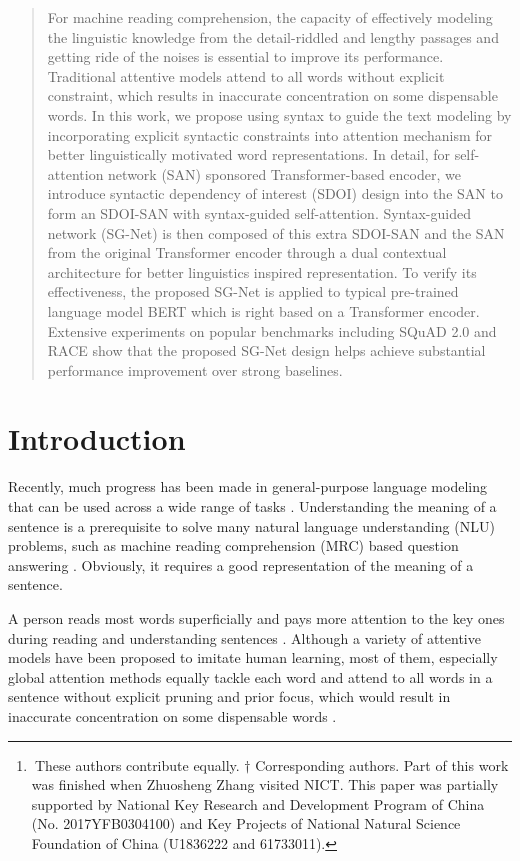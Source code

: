 \documentclass[letterpaper]{article} \usepackage{color}
\author{
	Zhuosheng Zhang\textsuperscript{\rm 1,2,3,\thanks{$\ $These authors contribute equally. $\dagger$ Corresponding authors. Part of this work was finished when Zhuosheng Zhang visited NICT. This paper was partially supported by National Key Research and Development Program of China (No. 2017YFB0304100) and Key Projects of National Natural Science Foundation of China (U1836222 and 61733011).}},
	Yuwei Wu\textsuperscript{\rm 1,2,3,4,*},
	Junru Zhou\textsuperscript{\rm 1,2,3},
	Sufeng Duan\textsuperscript{\rm 1,2,3}, \\
	\large \textbf{ 
		Hai Zhao\textsuperscript{\rm 1,2,3,$\dagger$},
		Rui Wang\textsuperscript{\rm 5,$\dagger$}
	}
	\\
	\textsuperscript{\rm 1}Department of Computer Science and Engineering, Shanghai Jiao Tong University\\
	\textsuperscript{\rm 2}Key Laboratory of Shanghai Education Commission for Intelligent Interaction\\
	and Cognitive Engineering, Shanghai Jiao Tong University, Shanghai, China\\
	\textsuperscript{\rm 3}MoE Key Lab of Artificial Intelligence, AI Institute, Shanghai Jiao Tong University, Shanghai, China\\
	\textsuperscript{\rm 4}College of Zhiyuan, Shanghai Jiao Tong University, China\\
	\textsuperscript{\rm 5}National Institute of Information and Communications Technology (NICT), Kyoto, Japan\\
	{\tt\{zhangzs,will8821\}@sjtu.edu.cn, zhaohai@cs.sjtu.edu.cn, wangrui@nict.go.jp} \\
}
\begin{document}
\maketitle

\begin{abstract}
For machine reading comprehension, the capacity of effectively modeling the linguistic knowledge from the detail-riddled and lengthy passages and getting ride of the noises is essential to improve its performance. Traditional attentive models attend to all words without explicit constraint, which results in inaccurate concentration on some dispensable words. In this work, we propose using syntax to guide the text modeling by incorporating explicit syntactic constraints into attention mechanism for better linguistically motivated word representations. In detail, for self-attention network (SAN) sponsored Transformer-based encoder, we introduce syntactic dependency of interest (SDOI) design into the SAN to form an SDOI-SAN with syntax-guided self-attention. Syntax-guided network (SG-Net) is then composed of this extra SDOI-SAN and the SAN from the original Transformer encoder through a dual contextual architecture for better linguistics inspired representation. To verify its effectiveness, the proposed SG-Net is applied to typical pre-trained language model BERT which is right based on a Transformer encoder. Extensive experiments on popular benchmarks including SQuAD 2.0 and RACE show that the proposed SG-Net design helps achieve substantial performance improvement over strong baselines.
\end{abstract}

\section{Introduction}
Recently, much progress has been made in general-purpose language modeling that can be used across a wide range of tasks \cite{radford2018improving,devlin2018bert,zhang2019semantics,zhou2019limit,zhang2019probing}. Understanding the meaning of a sentence is a prerequisite to solve many natural language understanding (NLU) problems, such as machine reading comprehension (MRC) based question answering \cite{Rajpurkar2018Know}. Obviously, it requires a good representation of the meaning of a sentence.

A person reads most words superficially and pays more attention to the key ones during reading and understanding sentences \cite{wang2017learning}. Although a variety of attentive models have been proposed to imitate human learning, most of them, especially global attention methods \cite{bahdanau2014neural} equally tackle each word and attend to all words in a sentence without explicit pruning and prior focus, which would result in inaccurate concentration on some dispensable words \cite{Mudrakarta2018Did}.
\end{document}
